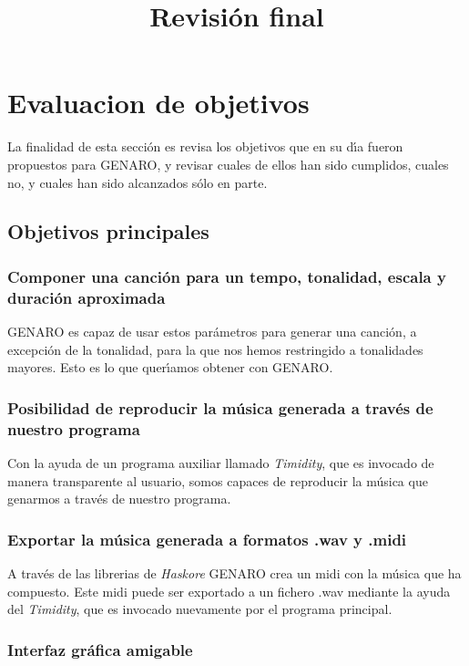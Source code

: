 \documentclass[a4paper,11pt]{article}
\title{Revisi\'on final}
\begin{document}
\maketitle
\tableofcontents
\section{Evaluacion de objetivos}
La finalidad de esta secci\'on es revisa los objetivos que en su d\'\i a fueron propuestos para GENARO, y revisar cuales de ellos han sido cumplidos, cuales no, y cuales han sido alcanzados s\'olo en parte.

\subsection{Objetivos principales}

\subsubsection{Componer una canci\'on para un tempo, tonalidad, escala y duraci\'on aproximada}

GENARO es capaz de usar estos par\'ametros para generar una canci\'on, a excepci\'on de la tonalidad, para la que nos hemos restringido a tonalidades mayores. Esto es lo que quer\'\i amos obtener con GENARO.

\subsubsection{Posibilidad de reproducir la m\'usica generada a trav\'es de nuestro programa}

Con la ayuda de un programa auxiliar llamado \emph{Timidity}, que es invocado de manera transparente al usuario, somos capaces de reproducir la m\'usica que genarmos a trav\'es de nuestro programa.

\subsubsection{Exportar la m\'usica generada a formatos .wav y .midi}

A trav\'es de las librerias de \emph{Haskore} GENARO crea un midi con la m\'usica que ha compuesto. Este midi puede ser exportado a un fichero .wav mediante la ayuda del \emph{Timidity}, que es invocado nuevamente por el programa principal.

\subsubsection{Interfaz gr\'afica amigable}
\end{document}
